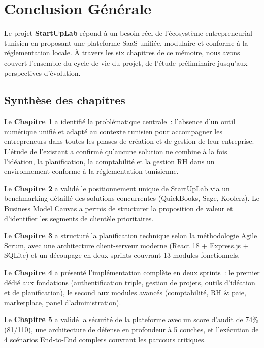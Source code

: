 \chapter*{Conclusion Générale}

Le projet \textbf{StartUpLab} répond à un besoin réel de l'écosystème entrepreneurial tunisien en proposant une plateforme SaaS unifiée, modulaire et conforme à la réglementation locale. À travers les six chapitres de ce mémoire, nous avons couvert l'ensemble du cycle de vie du projet, de l'étude préliminaire jusqu'aux perspectives d'évolution.

\section*{Synthèse des chapitres}

Le \textbf{Chapitre 1} a identifié la problématique centrale~: l'absence d'un outil numérique unifié et adapté au contexte tunisien pour accompagner les entrepreneurs dans toutes les phases de création et de gestion de leur entreprise. L'étude de l'existant a confirmé qu'aucune solution ne combine à la fois l'idéation, la planification, la comptabilité et la gestion RH dans un environnement conforme à la réglementation tunisienne.

Le \textbf{Chapitre 2} a validé le positionnement unique de StartUpLab via un benchmarking détaillé des solutions concurrentes (QuickBooks, Sage, Koolerz). Le Business Model Canvas a permis de structurer la proposition de valeur et d'identifier les segments de clientèle prioritaires.

Le \textbf{Chapitre 3} a structuré la planification technique selon la méthodologie Agile Scrum, avec une architecture client-serveur moderne (React 18 + Express.js + SQLite) et un découpage en deux sprints couvrant 13 modules fonctionnels.

Le \textbf{Chapitre 4} a présenté l'implémentation complète en deux sprints~: le premier dédié aux fondations (authentification triple, gestion de projets, outils d'idéation et de planification), le second aux modules avancés (comptabilité, RH \& paie, marketplace, panel d'administration).

Le \textbf{Chapitre 5} a validé la sécurité de la plateforme avec un score d'audit de 74\% (81/110), une architecture de défense en profondeur à 5 couches, et l'exécution de 4 scénarios End-to-End complets couvrant les parcours critiques.


